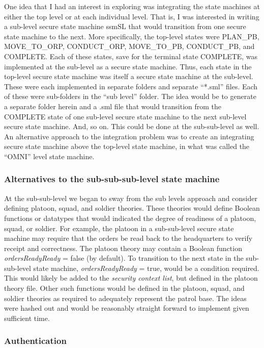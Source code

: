One idea that I had an interest in exploring was integrating the state machines at
either the top level or at each individual level. That is, I was interested in writing
a sub-level secure state machine ssmSL that would transition from one secure state
machine to the next. More specifically, the top-level states were PLAN_PB, MOVE_TO_ORP,
CONDUCT_ORP, MOVE_TO_PB, CONDUCT_PB, and COMPLETE. Each of these states, save for the
terminal state COMPLETE, was implemented at the sub-level as a secure state machine.
Thus, each state in the top-level secure state machine was itself a secure state machine
at the sub-level. These were each implemented in separate folders and separate “*.sml”
files. Each of these were sub-folders in the “sub level” folder. The idea would be to
generate a separate folder herein and a .sml file that would transition from the COMPLETE
state of one sub-level secure state machine to the next sub-level secure state machine.
And, so on. This could be done at the sub-sub-level as well. An alternative approach to
the integration problem was to create an integrating secure state machine above the top-level
state machine, in what was called the “OMNI” level state machine.

\subsubsection{Alternatives to the sub-sub-sub-level state machine}
\label{sec:alternatives-sub-sub}

At the sub-sub-level we began to sway from the sub levels approach and consider defining
platoon, squad, and soldier theories. These theories would define Boolean functions or
datatypes that would indicated the degree of readiness of a platoon, squad, or soldier.
For example, the platoon in a sub-sub-level secure state machine may require that the
orders be read back to the headquarters to verify receipt and correctness. The platoon
theory may contain a Boolean function \textit{ordersReadyReady} = false (by default). To transition
to the next state in the sub-sub-level state machine, \textit{ordersReadyReady} = true, would be
a condition required. This would likely be added to the \textit{security context list}, but defined
in the platoon theory file. Other such functions would be defined in the platoon, squad,
and soldier theories as required to adequately represent the patrol base. The ideas were
hashed out and would be reasonably straight forward to implement given sufficient time.

\subsubsection{Authentication}
\label{sec:authentication-2}

